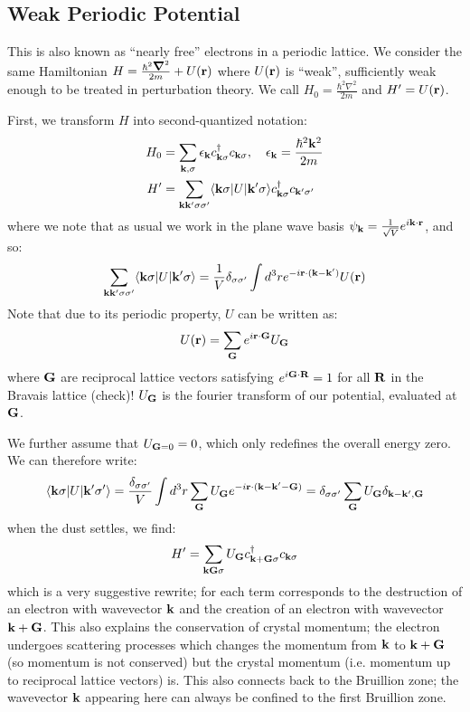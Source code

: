 \subsection{Weak Periodic Potential}
This is also known as ``nearly free'' electrons in a periodic lattice. We consider the same Hamiltonian $H = \frac{\hbar^2\nabla^2}{2m} + U(\v{r})$ where $U(\mathbf{r})$ is ``weak'', sufficiently weak enough to be treated in perturbation theory. We call $H_0 = \frac{\hbar^2\nabla^2}{2m}$ and $H' = U(\mathbf{r})$.

First, we transform $H$ into second-quantized notation:
\begin{equation}
    \begin{split}
        H_0 &= \sum_{\mathbf{k}, \sigma} \epsilon_{\mathbf{k}}c^\dagger_{\mathbf{k}\sigma}c_{\mathbf{k}\sigma}, \quad \epsilon_{\mathbf{k}} = \frac{\hbar^2\mathbf{k}^2}{2m}
        \\ H' &= \sum_{\mathbf{k}\mathbf{k}'\sigma\sigma'}\langle \mathbf{k}\sigma \rvert U\lvert \mathbf{k}'\sigma \rangle c_{\mathbf{k}\sigma}^\dagger c_{\mathbf{k}'\sigma'}
    \end{split}
\end{equation}
where we note that as usual we work in the plane wave basis $\psi_{\mathbf{k}} = \frac{1}{\sqrt{V}}e^{i\mathbf{k} \cdot \mathbf{r}}$, and so:
\begin{equation}
    \sum_{\mathbf{k}\mathbf{k}'\sigma\sigma'}\langle \mathbf{k}\sigma \rvert U\lvert \mathbf{k}'\sigma \rangle = \frac{1}{V}\delta_{\sigma\sigma'}\int d^3 r e^{-i\mathbf{r}\cdot(\mathbf{k} - \mathbf{k}')}U(\mathbf{r})
\end{equation}
Note that due to its periodic property, $U$ can be written as:
\begin{equation}
    U(\mathbf{r}) = \sum_{\mathbf{G}}e^{i\mathbf{r} \cdot \mathbf{G}}U_{\mathbf{G}}
\end{equation}
where $\mathbf{G}$ are reciprocal lattice vectors satisfying $e^{i\mathbf{G} \cdot \mathbf{R}} = 1$ for all $\mathbf{R}$ in the Bravais lattice (check)! $U_{\mathbf{G}}$ is the fourier transform of our potential, evaluated at $\mathbf{G}$.

We further assume that $U_{\mathbf{G} = 0} = 0$, which only redefines the overall energy zero. We can therefore write:
\begin{equation}
    \langle \mathbf{k}\sigma \rvert U\lvert \mathbf{k}'\sigma' \rangle = \frac{\delta_{\sigma\sigma'}}{V} \int d^3r \sum_{\mathbf{G}} U_{\mathbf{G}} e^{-i\mathbf{r}\cdot(\mathbf{k} - \mathbf{k'} - \mathbf{G})} = \delta_{\sigma\sigma'}\sum_{\mathbf{G}}U_{\mathbf{G}}\delta_{\mathbf{k} - \mathbf{k}', \mathbf{G}}
\end{equation}
when the dust settles, we find:
\begin{equation}
    H' = \sum_{\mathbf{k}\mathbf{G}\sigma} U_{\mathbf{G}} c^\dagger_{\mathbf{k} + \mathbf{G}\sigma}c_{\mathbf{k}\sigma}
\end{equation}
which is a very suggestive rewrite; for each term corresponds to the destruction of an electron with wavevector $\mathbf{k}$ and the creation of an electron with wavevector $\mathbf{k} + \mathbf{G}$. This also explains the conservation of crystal momentum; the electron undergoes scattering processes which changes the momentum from $\mathbf{k}$ to $\mathbf{k} + \mathbf{G}$ (so momentum is not conserved) but the crystal momentum (i.e. momentum up to reciprocal lattice vectors) is. This also connects back to the Bruillion zone; the wavevector $\mathbf{k}$ appearing here can always be confined to the first Bruillion zone.

